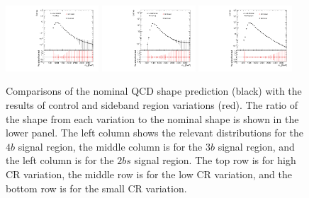 \begin{figure}[htbp!]
\begin{center}
\includegraphics[width=0.31\textwidth,angle=-90]{figures/boosted/Syst_CRSB/CR_Small_compare_FourTag_qcd_hh.pdf}
\includegraphics[width=0.31\textwidth,angle=-90]{figures/boosted/Syst_CRSB/CR_Small_compare_ThreeTag_qcd_hh.pdf}
\includegraphics[width=0.31\textwidth,angle=-90]{figures/boosted/Syst_CRSB/CR_Small_compare_TwoTag_split_qcd_hh.pdf}
\end{center}
\caption{Comparisons of the nominal QCD shape prediction (black) with the results of control and sideband region variations (red). The ratio of the shape from each variation to the nominal shape is shown in the lower panel. The left column shows the relevant distributions for the $4b$ signal region, the middle column is for the $3b$ signal region, and the left column is for the $2bs$ signal region. The top row is for high CR variation, the middle row is for the low CR variation, and the bottom row is for the small CR variation.}
\label{CRSB:QCDShapeSR-CR}
\end{figure}

